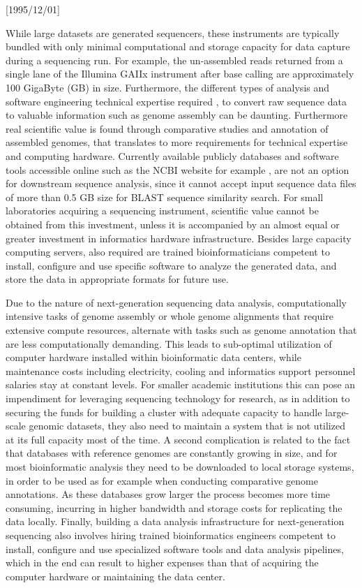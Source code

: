 \NeedsTeXFormat{LaTeX2e}[1995/12/01] \documentclass[10pt]{bmc_article}
\newenvironment{bmcformat}{\begin{raggedright}\baselineskip20pt\sloppy\setboolean{publ}{false}}{\end{raggedright}\baselineskip20pt\sloppy}
\begin{document}
\begin{bmcformat}
While large datasets are generated sequencers, these instruments are typically bundled with only minimal
computational and storage capacity for data capture during a sequencing run.  For example, the un-assembled reads
returned from a single lane of the Illumina GAIIx instrument after base calling are approximately 100 GigaByte
(GB) in size. Furthermore, the different types of analysis and software engineering technical expertise required 
\cite{gogol2012overview}, to convert raw sequence data to valuable information such as genome assembly can
be daunting. Furthermore real scientific value is found through comparative studies and annotation of assembled 
genomes, that translates to more requirements for technical expertise and computing hardware. Currently available 
publicly databases and software tools accessible online such as the NCBI website for example \cite{johnson2008ncbi},
are not an option for downstream sequence analysis, since it cannot accept input sequence data files of more than 0.5 GB
size for BLAST \cite{altschul1990basic}  sequence similarity search.  For small laboratories acquiring a sequencing 
instrument, scientific value cannot be obtained from this investment, unless it is accompanied by an almost equal 
or greater investment in informatics hardware infrastructure. Besides large capacity computing servers, also required 
are trained bioinformaticians competent to install, configure and use specific software to analyze the generated
data, and store the data in appropriate formats for future use.  \pb

Due to the nature of next-generation sequencing data analysis, computationally intensive tasks of genome
assembly or whole genome alignments that require extensive compute resources, alternate with tasks such as 
genome annotation that are less computationally demanding. This leads to sub-optimal utilization of computer 
hardware installed within bioinformatic data centers, while maintenance costs including electricity, cooling and
informatics support personnel salaries stay at constant levels. For smaller academic institutions this can pose an
impendiment for leveraging sequencing technology for research, as in addition to securing the funds for building 
a cluster with adequate capacity to handle large-scale genomic datasets, they also need to maintain a system 
that is not utilized at its full capacity most of the time.  A second complication is related to the fact that 
databases with reference genomes \cite{Pruitt2009} are constantly growing in size, and for most bioinformatic analysis they need 
to be downloaded to local storage systems, in order to be used as for example when conducting comparative 
genome annotations. As these databases grow larger the process becomes more time consuming, incurring in higher 
bandwidth and storage costs for replicating the data locally.  Finally, building a data analysis infrastructure 
for next-generation sequencing also involves hiring trained bioinformatics engineers competent to install, 
configure and use specialized software tools and data analysis pipelines, which in the end can result to 
higher expenses than that of acquiring the computer hardware or maintaining the data center. \pb




\end{bmcformat}
\end{document}
